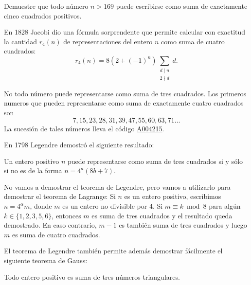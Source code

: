 \begin{exercise}
	Demuestre que todo número $n>169$ puede escribirse como suma de exactamente
	cinco cuadrados positivos.
\end{exercise}

En 1828 Jacobi dio una fórmula sorprendente que permite calcular con exactitud
la cantidad $r_{4}(n)$ de representaciones del entero $n$ como suma de cuatro
cuadrados:
\[
	r_{4}(n)=8(2+(-1)^n)\sum_{\substack{d\mid n\\2\nmid d}}d.
\]

No todo número puede representarse como suma de tres cuadrados.  Los primeros
numeros que pueden representarse como suma de exactamente cuatro cuadrados son 
\[
	7, 15, 23, 28, 31, 39, 47, 55, 60, 63, 71\dots
\]
La sucesión de tales números lleva el código \href{https://oeis.org/A004215}{A004215}.

En 1798 Legendre demostró el siguiente resultado:

\begin{theorem}[Legendre]
Un entero positivo $n$ puede representarse como suma de tres
cuadrados si y sólo si no es de la forma $n=4^a(8b+7)$. 
\end{theorem}

No vamos a demostrar el teorema de Legendre, pero vamos a utilizarlo 
para demostrar el teorema de Lagrange: Si $n$ es un
entero positivo, escribimos $n=4^{\alpha}m$, donde $m$ es un entero no
divisible por $4$. Si $m\equiv k\bmod 8$ para algún $k\in\{1,2,3,5,6\}$,
entonces $m$ es suma de tres cuadrados y el resultado queda demostrado. En caso
contrario, $m-1$ es también suma de tres cuadrados y luego $m$ es suma de
cuatro cuadrados. 




El teorema de Legendre también permite además demostrar fácilmente el siguiente
teorema de Gauss:

\begin{theorem}[Gauss]
	Todo entero positivo es suma de tres números triangulares.
\end{theorem}

